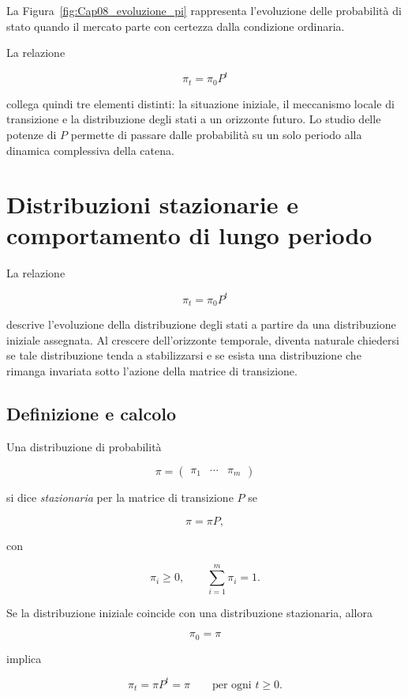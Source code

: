 La Figura~\ref{fig:Cap08_evoluzione_pi} rappresenta l'evoluzione delle
probabilit\`{a} di stato quando il mercato parte con certezza dalla
condizione ordinaria.


La relazione

\[
\pi_t=\pi_0P^t
\]

collega quindi tre elementi distinti: la situazione iniziale, il
meccanismo locale di transizione e la distribuzione degli stati a un
orizzonte futuro. Lo studio delle potenze di \(P\) permette di passare
dalle probabilit\`{a} su un solo periodo alla dinamica complessiva della
catena.

\section{Distribuzioni stazionarie e comportamento di lungo periodo}

La relazione

\[
\pi_t=\pi_0P^t
\]

descrive l'evoluzione della distribuzione degli stati a partire da una
distribuzione iniziale assegnata. Al crescere dell'orizzonte temporale,
diventa naturale chiedersi se tale distribuzione tenda a stabilizzarsi
e se esista una distribuzione che rimanga invariata sotto l'azione
della matrice di transizione.

\subsection{Definizione e calcolo}

\begin{definition}
Una distribuzione di probabilit\`{a}

\[
\pi=
\begin{pmatrix}
\pi_1 & \cdots & \pi_m
\end{pmatrix}
\]

si dice \emph{stazionaria} per la matrice di transizione \(P\) se

\[
\pi=\pi P,
\]

con

\[
\pi_i\geq 0,
\qquad
\sum_{i=1}^{m}\pi_i=1.
\]
\end{definition}

Se la distribuzione iniziale coincide con una distribuzione
stazionaria, allora

\[
\pi_0=\pi
\]

implica

\[
\pi_t=\pi P^t=\pi
\qquad
\text{per ogni }t\geq 0.
\]

